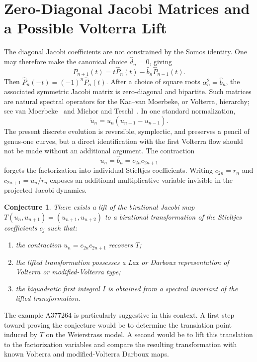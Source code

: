 \documentclass[11pt]{article}
\newtheorem{conjecture}[theorem]{Conjecture}
\theoremstyle{remark}
\begin{document}
\section{Zero-Diagonal Jacobi Matrices and a Possible Volterra Lift}
The diagonal Jacobi coefficients are not constrained by the Somos identity. One may therefore make the canonical choice $\widehat d_n=0$, giving
\begin{equation}
\widehat P_{n+1}(t)=t\widehat P_n(t)-\widehat b_n\widehat P_{n-1}(t).
\end{equation}
Then $\widehat P_n(-t)=(-1)^n\widehat P_n(t)$. After a choice of square roots $\alpha_n^2=\widehat b_n$, the associated symmetric Jacobi matrix is zero-diagonal and bipartite. Such matrices are natural spectral operators for the Kac--van Moerbeke, or Volterra, hierarchy; see van Moerbeke~\cite{VanMoerbeke1976} and Michor and Teschl~\cite{MichorTeschl2009}. In one standard normalization,
\begin{equation}
\dot u_n=u_n(u_{n+1}-u_{n-1}).
\end{equation}
The present discrete evolution is reversible, symplectic, and preserves a pencil of genus-one curves, but a direct identification with the first Volterra flow should not be made without an additional argument. The contraction
\begin{equation}
u_n=\widehat b_n=c_{2n}c_{2n+1}
\end{equation}
forgets the factorization into individual Stieltjes coefficients. Writing $c_{2n}=r_n$ and $c_{2n+1}=u_n/r_n$ exposes an additional multiplicative variable invisible in the projected Jacobi dynamics.
\begin{conjecture}
There exists a lift of the birational Jacobi map $T(u_n,u_{n+1})=(u_{n+1},u_{n+2})$ to a birational transformation of the Stieltjes coefficients $c_j$ such that:
\begin{enumerate}
\item the contraction $u_n=c_{2n}c_{2n+1}$ recovers $T$;
\item the lifted transformation possesses a Lax or Darboux representation of Volterra or modified-Volterra type;
\item the biquadratic first integral $I$ is obtained from a spectral invariant of the lifted transformation.
\end{enumerate}
\end{conjecture}
The example A377264 is particularly suggestive in this context. A first step toward proving the conjecture would be to determine the translation point induced by $T$ on the Weierstrass model. A second would be to lift this translation to the factorization variables and compare the resulting transformation with known Volterra and modified-Volterra Darboux maps.
\end{document}
